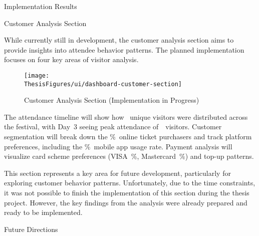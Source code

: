 \begin{section}{Implementation Results}
	\begin{subsection}{Customer Analysis Section}
		\label{subsec:implementation-results-structure-customer}

		While currently still in development, the customer analysis section aims to provide insights into attendee behavior patterns.
		The planned implementation focuses on four key areas of visitor analysis.

		\begin{figure}[H]
			\centering
			\texttt{[image: \\ThesisFigures/ui/dashboard-customer-section]}
			\caption{Customer Analysis Section (Implementation in Progress)}
			\label{fig:dashboard-customer-analysis}
		\end{figure}

		The attendance timeline will show how ~unique visitors were distributed across the festival, with Day~3 seeing peak attendance of~~visitors.
		Customer segmentation will break down the \%~online ticket purchasers and track platform preferences, including the \%~mobile app usage rate.
		Payment analysis will visualize card scheme preferences (VISA~\%, Mastercard~\%) and top-up patterns.

		This section represents a key area for future development, particularly for exploring customer behavior patterns.
		Unfortunately, due to the time constraints, it was not possible to finish the implementation of this section during the thesis project.
		However, the key findings from the analysis were already prepared and ready to be implemented.
	\end{subsection}
\end{section}


\begin{section}{Future Directions}
	\label{sec:future-directions}
\end{section}


